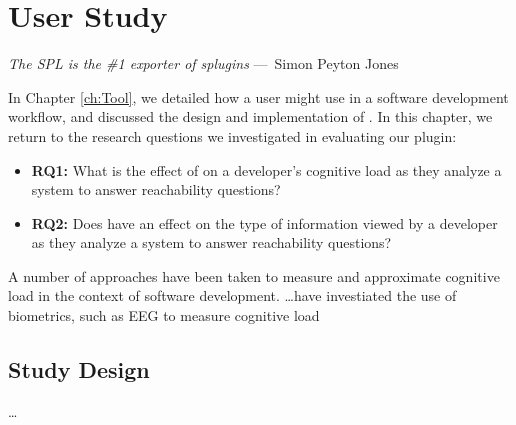 
\chapter{User Study}
\label{ch:UserStudy}

\begin{epigraph}
    \emph{
      The SPL is the \#1 exporter of splugins
      } ---~Simon Peyton Jones
\end{epigraph}

\noindent In Chapter \ref{ch:Tool}, we detailed how a user might use
\toolname{} in a software development workflow, and discussed the design and 
implementation of \toolname{}.
In this chapter, we return to the research questions we investigated in
evaluating our plugin:

\begin{itemize}
  \item[] \textbf{RQ1:} What is the effect of \toolname{} on a developer's 
  cognitive load as they analyze a system to answer reachability questions?
  \item[] \textbf{RQ2:} Does \toolname{} have an effect on the type of 
  information viewed by a developer as they analyze a system to answer
  reachability questions?
\end{itemize}

A number of approaches have been taken to measure and approximate cognitive
load in the context of software development.
\dots have investiated the use of biometrics, such as \ac{EEG} to measure
cognitive load
\section{Study Design}
\label{sec:StudyDesign}

\dots

\endinput
